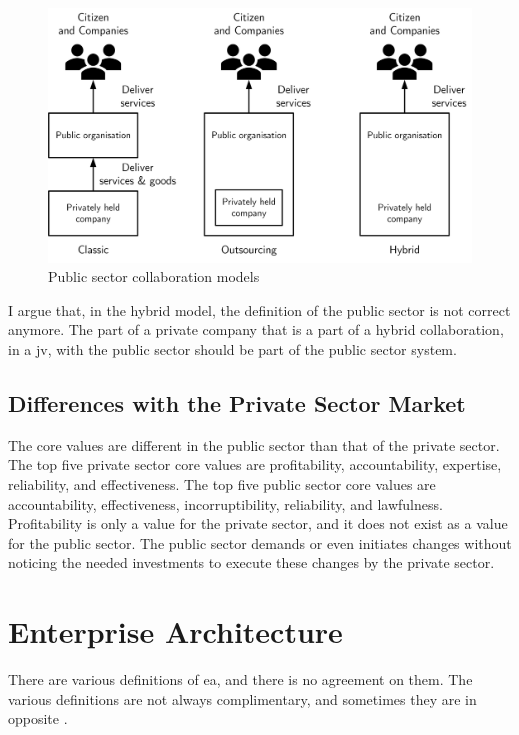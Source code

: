 \begin{figure}[H]
	\centering
	\includegraphics[width=0.7\linewidth]{images/publicsector3modelsofcolaboration}
	\caption[Public sector collaboration models]{Public sector collaboration models}
	\label{fig:publicsector3modelsofcolaboration}
\end{figure}

I argue that, in the hybrid model, the definition of the public sector is not correct anymore. The part of a private company that is a part of a hybrid collaboration, in a \gls{jv}, with the public sector should be part of the public sector system.

\subsection{Differences with the Private Sector Market}
\label{sub:tbdifferenceprivatesector}



The core values are different in the public sector than that of the private sector. The top five private sector core values are profitability, accountability, expertise, reliability, and effectiveness. The top five public sector core values are accountability, effectiveness, incorruptibility, reliability, and lawfulness. \parencite{Wal2008} Profitability is only a value for the private sector, and it does not exist as a value for the public sector.  The public sector demands or even initiates changes without noticing the needed investments to execute these changes by the private sector.

\section{Enterprise Architecture}
\label{sec:tbenterprisearchitecture}
There are various definitions of \acrlong{ea}, and there is no agreement on them. The various definitions are not always complimentary, and sometimes they are in opposite \parencite{Lapalme2012,SaintLouis2019,Hoogervorst2009}. 

